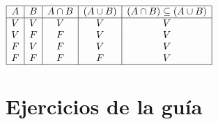 \begin{enumerate}[label=\arabic*)]
	      $\begin{array}{|c|c|c|c|c|}
			      \hline
			      A & B & A \cap B & (A \cup B) & (A \cap B) \subseteq (A \cup B) \\ \hline
			      V & V & V          & V            & V                                   \\
			      V & F & F          & V            & V                                   \\
			      F & V & F          & V            & V                                   \\
			      F & F & F          & F            & V                                   \\ \hline
		      \end{array}
	      $
\end{enumerate}

\newpage
\section*{Ejercicios de la guía}



















































